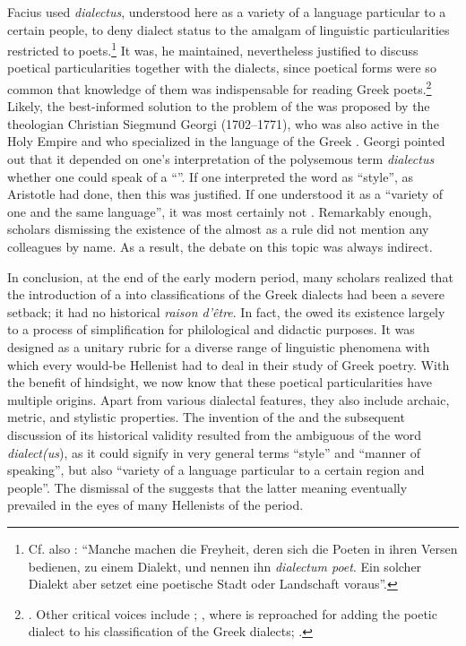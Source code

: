 Facius used \textit{dialectus}, understood here as a variety of a language particular to a certain people, to deny dialect status to the amalgam of linguistic particularities restricted to poets.\footnote{Cf. also \citet[67]{Haas1780}: “Manche machen die Freyheit, deren sich die Poeten in ihren Versen bedienen, zu einem Dialekt, und nennen ihn \textit{dialectum poet}. Ein solcher Dialekt aber setzet eine poetische Stadt oder Landschaft voraus”.} It was, he maintained, nevertheless justified to discuss poetical particularities together with the dialects, since poetical forms were so common that knowledge of them was indispensable for reading Greek poets.\footnote{\citet[98]{Facius1782}. Other critical voices include \citet[\textsc{a.3}\textsc{\textsuperscript{v}}]{Bolius1689}; \citet[\textsc{d.2}\textsc{\textsuperscript{v}}]{Thryllitsch1709}, where \citet[147]{Reyher1634} is reproached for adding the poetic dialect to his classification of the Greek dialects; \citet[136--167]{Walch1772}.} Likely, the best-informed solution to the problem of the  was proposed by the theologian Christian Siegmund Georgi (1702–1771), who was also active in the Holy  Empire and who specialized in the language of the Greek . Georgi pointed out that it depended on one’s interpretation of the polysemous term \textit{dialectus} whether one could speak of a “”. If one interpreted the word as “style”, as Aristotle had done, then this was justified. If one understood it as a “variety of one and the same language”, it was most certainly not \citep[169]{Georgi1733}. Remarkably enough, scholars dismissing the existence of the  almost as a rule did not mention any colleagues by name. As a result, the debate on this topic was always indirect.

In conclusion, at the end of the early modern period, many scholars realized that the introduction of a  into classifications of the Greek dialects had been a severe setback; it had no historical \textit{raison d’être}. In fact, the  owed its existence largely to a process of simplification for philological and didactic purposes. It was designed as a unitary rubric for a diverse range of linguistic phenomena with which every would-be Hellenist had to deal in their study of Greek poetry. With the benefit of hindsight, we now know that these poetical particularities have multiple origins. Apart from various dialectal features, they also include archaic, metric, and stylistic properties. The invention of the  and the subsequent discussion of its historical validity resulted from the ambiguous  of the word \textit{dialect(us}), as it could signify in very general terms “style” and “manner of speaking”, but also “variety of a language particular to a certain region and people”. The dismissal of the  suggests that the latter meaning eventually prevailed in the eyes of many Hellenists of the period.

